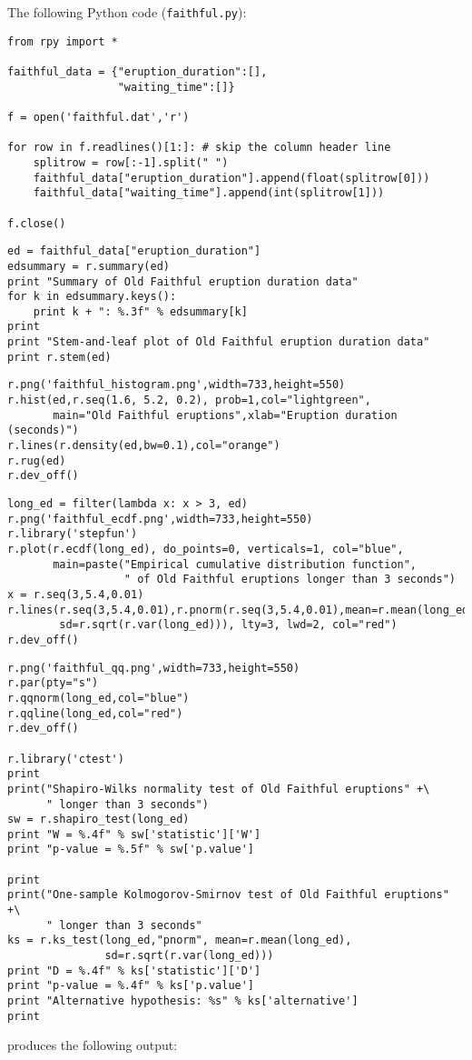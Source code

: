 \documentclass[11pt]{article}
\begin{document}
The following Python code (\texttt{faithful.py}):
\begin{verbatim}
from rpy import *

faithful_data = {"eruption_duration":[],
                 "waiting_time":[]}

f = open('faithful.dat','r')

for row in f.readlines()[1:]: # skip the column header line
    splitrow = row[:-1].split(" ")
    faithful_data["eruption_duration"].append(float(splitrow[0]))
    faithful_data["waiting_time"].append(int(splitrow[1]))

f.close()
\end{verbatim}
\begin{verbatim}
ed = faithful_data["eruption_duration"]
edsummary = r.summary(ed)
print "Summary of Old Faithful eruption duration data"
for k in edsummary.keys():
    print k + ": %.3f" % edsummary[k]
print
print "Stem-and-leaf plot of Old Faithful eruption duration data"
print r.stem(ed)
\end{verbatim}
\begin{verbatim}
r.png('faithful_histogram.png',width=733,height=550)
r.hist(ed,r.seq(1.6, 5.2, 0.2), prob=1,col="lightgreen",
       main="Old Faithful eruptions",xlab="Eruption duration (seconds)")
r.lines(r.density(ed,bw=0.1),col="orange")
r.rug(ed)
r.dev_off()
\end{verbatim}
\begin{verbatim}
long_ed = filter(lambda x: x > 3, ed)
r.png('faithful_ecdf.png',width=733,height=550)
r.library('stepfun')
r.plot(r.ecdf(long_ed), do_points=0, verticals=1, col="blue",
       main=paste("Empirical cumulative distribution function",
                  " of Old Faithful eruptions longer than 3 seconds")
x = r.seq(3,5.4,0.01)
r.lines(r.seq(3,5.4,0.01),r.pnorm(r.seq(3,5.4,0.01),mean=r.mean(long_ed),
        sd=r.sqrt(r.var(long_ed))), lty=3, lwd=2, col="red")
r.dev_off()
\end{verbatim}
\begin{verbatim}
r.png('faithful_qq.png',width=733,height=550)
r.par(pty="s")
r.qqnorm(long_ed,col="blue")
r.qqline(long_ed,col="red")
r.dev_off()

r.library('ctest')
print
print("Shapiro-Wilks normality test of Old Faithful eruptions" +\
      " longer than 3 seconds")
sw = r.shapiro_test(long_ed)
print "W = %.4f" % sw['statistic']['W']
print "p-value = %.5f" % sw['p.value']

print
print("One-sample Kolmogorov-Smirnov test of Old Faithful eruptions" +\
      " longer than 3 seconds"
ks = r.ks_test(long_ed,"pnorm", mean=r.mean(long_ed),
               sd=r.sqrt(r.var(long_ed)))
print "D = %.4f" % ks['statistic']['D']
print "p-value = %.4f" % ks['p.value']
print "Alternative hypothesis: %s" % ks['alternative']
print
\end{verbatim}
produces the following output:
\end{document}
